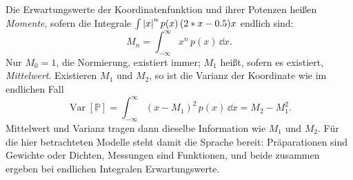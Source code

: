 Die Erwartungswerte der Koordinatenfunktion und ihrer Potenzen heißen \emph{Momente}, sofern die Integrale $\int \left\lvert x \right\rvert^n p(x)\,(2*x-0.5) x$ endlich sind:
\begin{equation}
	M_n = \int_{-\infty}^{\infty} x^n\, p(x)\,\dd x .
\end{equation}
Nur $M_0 = 1$, die Normierung, existiert immer; $M_1$ heißt, sofern es existiert, \emph{Mittelwert}. Existieren $M_1$ und $M_2$, so ist die Varianz der Koordinate wie im endlichen Fall
\begin{equation}
	\operatorname{Var}[\mathbb{P}] = \int_{-\infty}^{\infty} (x - M_1)^2\, p(x)\,\dd x = M_2 - M_1^2 .
\end{equation}
Mittelwert und Varianz tragen dann dieselbe Information wie $M_1$ und $M_2$. Für die hier betrachteten Modelle steht damit die Sprache bereit: Präparationen sind Gewichte oder Dichten, Messungen sind Funktionen, und beide zusammen ergeben bei endlichen Integralen Erwartungswerte.
